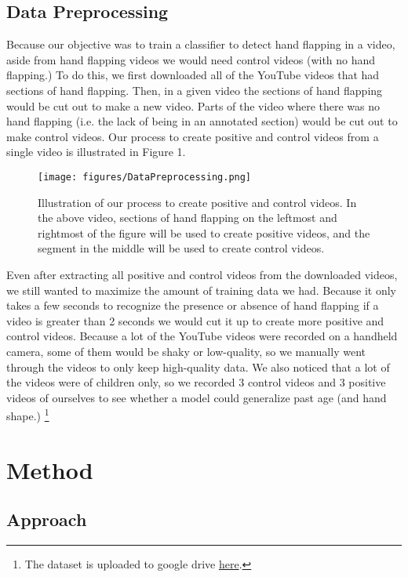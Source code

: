 \documentclass{article}
\begin{document}
\subsection{Data Preprocessing}

Because our objective was to train a classifier to detect hand flapping in a video, aside from hand flapping videos we would need control videos (with no hand flapping.) To do this, we first downloaded all of the YouTube videos that had sections of hand flapping. Then, in a given video the sections of hand flapping would be cut out to make a new video. Parts of the video where there was no hand flapping (i.e. the lack of being in an annotated section) would be cut out to make control videos. Our process to create positive and control videos from a single video is illustrated in Figure 1. 

\begin{figure}[h!]
\centering
\texttt{[image: figures/DataPreprocessing.png]}
\caption{Illustration of our process to create positive and control videos. In the above video, sections of hand flapping on the leftmost and rightmost of the figure will be used to create positive videos, and the segment in the middle will be used to create control videos.}
\label{fig:method}
\end{figure}

Even after extracting all positive and control videos from the downloaded videos, we still wanted to maximize the amount of training data we had. Because it only takes a few seconds to recognize the presence or absence of hand flapping if a video is greater than 2 seconds we would cut it up to create more positive and control videos. Because a lot of the YouTube videos were recorded on a handheld camera, some of them would be shaky or low-quality, so we manually went through the videos to only keep high-quality data. We also noticed that a lot of the videos were of children only, so we recorded 3 control videos and 3 positive videos of ourselves to see whether a model could generalize past age (and hand shape.)  \footnote{The dataset is uploaded to google drive \href{https://tinyurl.com/47fya6}{here}.}

\section{Method}
\subsection{Approach} 
\end{document}

